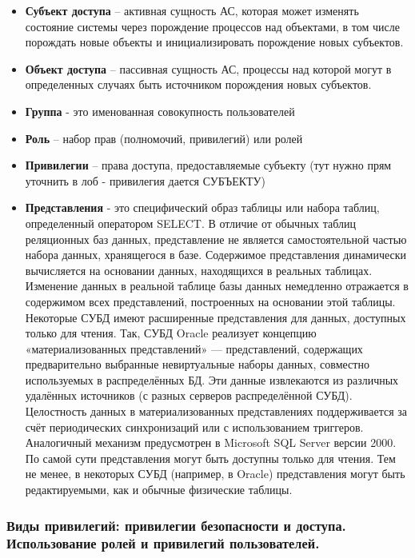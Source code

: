 \begin{itemize}
    \item \textbf{Субъект доступа} – активная сущность АС, которая может
        изменять состояние системы через порождение процессов над объектами, в том числе порождать
        новые объекты и инициализировать порождение новых субъектов.
    \item \textbf{Объект доступа} – пассивная сущность АС, процессы над которой могут в определенных случаях
        быть источником порождения новых субъектов.
    \item \textbf{Группа} - это именованная совокупность пользователей
    \item \textbf{Роль} – набор прав (полномочий, привилегий) или ролей
    \item \textbf{Привилегии} – права доступа, предоставляемые субъекту (тут нужно прям уточнить в лоб -
        привилегия дается СУБЪЕКТУ)
    \item \textbf{Представления} - это специфический образ таблицы или набора таблиц, определенный
        оператором SELECT. В отличие от обычных таблиц реляционных баз данных, представление не
        является самостоятельной частью набора данных, хранящегося в базе. Содержимое представления
        динамически вычисляется на основании данных, находящихся в реальных таблицах. Изменение
        данных в реальной таблице базы данных немедленно отражается в содержимом всех
        представлений, построенных на основании этой таблицы. Некоторые СУБД имеют расширенные
        представления для данных, доступных только для чтения.
        Так, СУБД Oracle реализует концепцию
        «материализованных представлений» — представлений, содержащих предварительно выбранные
        невиртуальные наборы данных, совместно используемых в распределённых БД. Эти данные
        извлекаются из различных удалённых источников (с разных серверов распределённой СУБД).
        Целостность данных в материализованных представлениях поддерживается за счёт периодических
        синхронизаций или с использованием триггеров. Аналогичный механизм предусмотрен в Microsoft
        SQL Server версии 2000. По самой сути представления могут быть доступны только для чтения.
        Тем не менее, в некоторых СУБД (например, в Oracle) представления могут быть редактируемыми,
        как и обычные физические таблицы.
\end{itemize}


\subsubsection{Виды привилегий: привилегии безопасности и доступа. Использование ролей и привилегий пользователей.}

